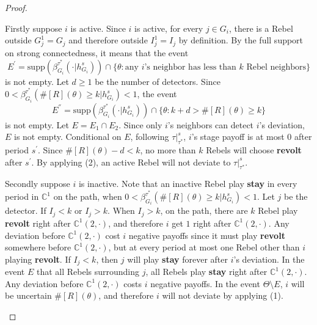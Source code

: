 \documentclass[12pt,letter]{article}
\newcommand{\Kappa}{\mathbb{C}}
\theoremstyle{definition}
\theoremstyle{remark}
\theoremstyle{claim}
\begin{document}
\begin{proof}
\begin{enumerate}[label=(\arabic*)]
Firstly suppose $i$ is active. Since $i$ is active, for every $j\in G_i$, there is a Rebel outside $G^1_j=G_j$ and therefore outside $I^1_j=I_j$ by definition. By the full support on strong connectedness, it means that the event
\[E^{'}=\mathrm{supp}(\beta^{\tau^{*}}_{G_i}(\cdot |h^s_{G_i}))\cap \{\theta:\text{any $i$'s neighbor has less than $k$ Rebel neighbors}\}\]
is not empty. Let $d\geq 1$ be the number of detectors. Since $0<\beta^{\tau^{*}}_{G_i}(\#[R](\theta)\geq k|h^s_{G_i})<1$, the event
\[E^{''}=\mathrm{supp}(\beta^{\tau^{*}}_{G_i}(\cdot |h^s_{G_i}))\cap \{\theta:k+d>\#[R](\theta)\geq k\}\] 
is not empty. Let $E=E_1\cap E_2$. Since only $i$'s neighbors can detect $i$'s deviation, $E$ is not empty. Conditional on $E$, following $\tau|^s_{\tau^{*}}$, $i$'s stage payoff is at most 0 after period $s^{'}$. Since $\#[R](\theta)-d<k$, no more than $k$ Rebels will choose \textbf{revolt} after $s^{'}$. By applying (2), an active Rebel will not deviate to $\tau|^s_{\tau^{*}}$.

Secondly suppose $i$ is inactive. Note that an inactive Rebel play \textbf{stay} in every period in $\Kappa^1$ on the path, when $0<\beta^{\tau^{*}}_{G_i}(\#[R](\theta)\geq k|h^s_{G_i})<1$. Let $j$ be the detector. If $I_j<k$ or $I_j>k$. When $I_j>k$, on the path, there are $k$ Rebel play \textbf{revolt} right after $\Kappa^1(2,\cdot)$, and therefore $i$ get $1$ right after $\Kappa^1(2,\cdot)$. Any deviation before $\Kappa^1(2,\cdot)$ cost $i$ negative payoffs since it must play \textbf{revolt} somewhere before $\Kappa^1(2,\cdot)$, but at every period at most one Rebel other than $i$ playing \textbf{revolt}. If $I_j<k$, then $j$ will play \textbf{stay} forever after $i$'s deviation. In the event $E$ that all Rebels surrounding $j$, all Rebels play \textbf{stay} right after $\Kappa^1(2,\cdot)$. Any deviation before $\Kappa^1(2,\cdot)$ costs $i$ negative payoffs. In the event $\Theta\setminus E$, $i$ will be uncertain $\#[R](\theta)$, and therefore $i$ will not deviate by applying (1).
\end{enumerate}
\end{proof}
\end{document}
